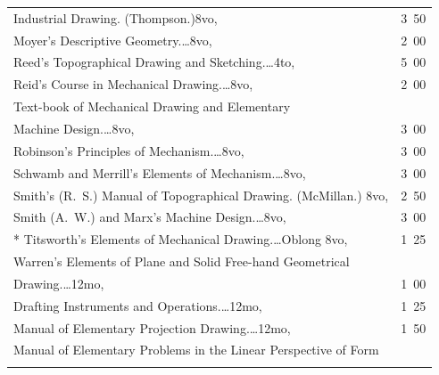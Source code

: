 \documentclass[a4paper,12pt]{book}[2004/02/16]
\theoremstyle{ilemma}
\theoremstyle{itheorem}
\theoremstyle{iother}
\theoremstyle{icorollary}
\theoremstyle{numcorollary}
\theoremstyle{idefinition}
\begin{document}
\begin{longtable}{@{}l@{ }r@{}}
\nopagebreak

\indent Industrial Drawing. (Thompson.)\dotfill 8vo, &3\ 50\\

Moyer's Descriptive Geometry.\dotfill\ldots 8vo, &2\ 00\\

Reed's Topographical Drawing and Sketching.\dotfill\ldots 4to, &5\ 00\\

Reid's Course in Mechanical Drawing.\dotfill\ldots 8vo, &2\ 00\\

\nopagebreak

\indent Text-book of Mechanical Drawing and Elementary\\

\nopagebreak

\indent\indent Machine Design.\dotfill\ldots 8vo, &3\ 00\\

Robinson's Principles of Mechanism.\dotfill\ldots 8vo, &3\ 00\\

Schwamb and Merrill's Elements of Mechanism.\dotfill\ldots 8vo, &3\ 00\\

Smith's (R.~S.) Manual of Topographical Drawing. (McMillan.)\dotfill
8vo, &2\ 50\\

Smith (A.~W.) and Marx's Machine Design.\dotfill\ldots 8vo, &3\ 00\\

* Titsworth's Elements of Mechanical Drawing.\dotfill\ldots Oblong
  8vo, &1\ 25\\

Warren's Elements of Plane and Solid Free-hand Geometrical\\

\nopagebreak

\indent\indent Drawing.\dotfill\ldots 12mo, &1\ 00\\

\indent Drafting Instruments and Operations.\dotfill\ldots 12mo, &1\ 25\\

\indent Manual of Elementary Projection Drawing.\dotfill\ldots 12mo,
&1\ 50\\

\indent Manual of Elementary Problems in the Linear Perspective of Form\\

\nopagebreak


\end{longtable}
\end{document}
